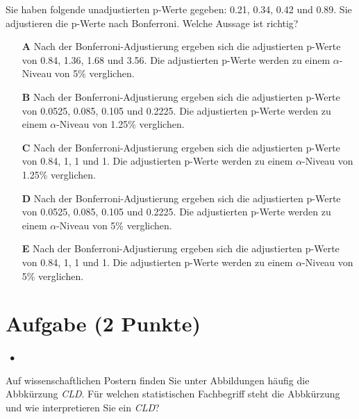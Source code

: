 \documentclass[a4paper, 9pt]{scrartcl}\usepackage[]{graphicx}\usepackage[]{xcolor}
\begin{document}
Sie haben folgende unadjustierten p-Werte gegeben: 0.21, 0.34, 0.42 und 0.89. Sie adjustieren die p-Werte nach
Bonferroni. Welche Aussage ist richtig?



\begin{enumerate}
\item [\textbf{A} \msquare] Nach der Bonferroni-Adjustierung ergeben sich die adjustierten p-Werte von 0.84, 1.36, 1.68 und 3.56. Die adjustierten p-Werte werden zu einem $\alpha$-Niveau von 5\% verglichen.
\item [\textbf{B} \msquare] Nach der Bonferroni-Adjustierung ergeben sich die adjustierten p-Werte von 0.0525, 0.085, 0.105 und 0.2225. Die adjustierten p-Werte werden zu einem $\alpha$-Niveau von 1.25\% verglichen.
\item [\textbf{C} \msquare] Nach der Bonferroni-Adjustierung ergeben sich die adjustierten p-Werte von 0.84, 1, 1 und 1. Die adjustierten p-Werte werden zu einem $\alpha$-Niveau von 1.25\% verglichen.
\item [\textbf{D} \msquare] Nach der Bonferroni-Adjustierung ergeben sich die adjustierten p-Werte von 0.0525, 0.085, 0.105 und 0.2225. Die adjustierten p-Werte werden zu einem $\alpha$-Niveau von 5\% verglichen.
\item [\textbf{E} \msquare] Nach der Bonferroni-Adjustierung ergeben sich die adjustierten p-Werte von 0.84, 1, 1 und 1. Die adjustierten p-Werte werden zu einem $\alpha$-Niveau von 5\% verglichen.
\end{enumerate}

\section{Aufgabe \hfill (2 Punkte)}

\ifcollection
\begin{flushright}
\tiny\vspace{-2Ex}
\textbf{\examinhaltstart}
\exammodulestatversuch $\;\bullet$
\exammodulebiostat
\vspace{-1Ex}
\end{flushright}
\fi




Auf wissenschaftlichen Postern finden Sie unter Abbildungen häufig die Abbkürzung \textit{CLD}. Für welchen statistischen Fachbegriff steht die Abbkürzung und wie interpretieren Sie ein \textit{CLD}?
\end{document}
